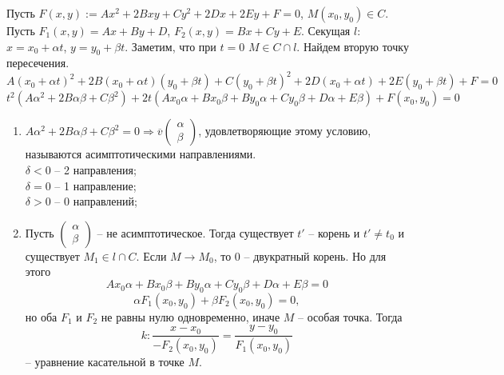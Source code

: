     \begin{theorem}
            Пусть $F(x,y) := A x^2 + 2B xy + C y^2 + 2Dx + 2Ey + F = 0$, $M(x_{0}, y_{0}) \in C$.\\
        Пусть $F_{1}(x, y) = Ax + By + D$, $F_{2}(x, y) = Bx + Cy + E$. Секущая $l:$ $x = x_0 + \alpha t$, $y = y_0 + \beta t$. Заметим, что при $t = 0$ $M \in C \cap l$. Найдем вторую точку пересечения.\\
        \[A(x_{0} + \alpha t)^2 + 2B(x_{0} + \alpha t)(y_{0} + \beta t) + C(y_0 + \beta t)^2 + 2D(x_0 + \alpha t) + 2E(y_0 + \beta t) + F = 0\]
        \[t^{2}(A \alpha^2 + 2B\alpha\beta + C\beta^2) + 2t(A x_0 \alpha + B x_0 \beta + B y_0 \alpha + C y_{0} \beta + D\alpha + E\beta) + F(x_{0}, y_{0}) = 0\]
        \begin{enumerate}
            \item $A\alpha^2 + 2B\alpha\beta + C\beta^2 = 0 \Rightarrow \overline{v}\begin{pmatrix}
    		\alpha\\ \beta
            \end{pmatrix}$, удовлетворяющие этому условию, называются асимптотическими направлениями. \\
            $\delta < 0$ -- 2 направления;\\
            $\delta = 0$ -- 1 направление;\\
            $\delta > 0$ -- 0 направлений;
            \item Пусть $\begin{pmatrix}
    		\alpha\\ \beta
            \end{pmatrix}$ -- не асимптотическое. Тогда существует $t'$ -- корень и $t' \neq t_0$ и существует $M_{1} \in l \cap C$. Если $M \to M_0$, то $0$ -- двукратный корень. Но для этого 
            \[Ax_0 \alpha + B x_0 \beta + B y_0 \alpha + C y_0 \beta + D \alpha + E \beta = 0\]
            \[\alpha F_{1}(x_{0}, y_{0}) + \beta F_{2}(x_{0}, y_{0}) = 0,\]
            но оба $F_1$ и $F_2$ не равны нулю одновременно, иначе $M$ -- особая точка. Тогда
            \[ k: \frac{x - x_0}{-F_{2}(x_{0}, y_{0})} = \frac{y - y_0}{F_{1}(x_{0}, y_{0})}\]
            -- уравнение касательной в точке $M$. 
        \end{enumerate}
    \end{theorem}